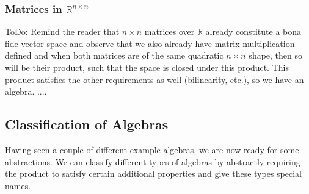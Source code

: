 \subsubsection{Matrices in $\mathbb{R}^{n \times n}$}
ToDo: Remind the reader that $n \times n$ matrices over $\mathbb{R}$ already constitute a bona fide vector space and observe that we also already have matrix multiplication defined and when both matrices are of the same quadratic $n \times n$ shape, then so will be their product, such that the space is closed under this product. This product satisfies the other requirements as well (bilinearity, etc.), so we have an algebra. ....












\subsection{Classification of Algebras}
Having seen a couple of different example algebras, we are now ready for some abstractions. We can classify different types of algebras by abstractly requiring the product to satisfy certain additional properties and give these types special names.

